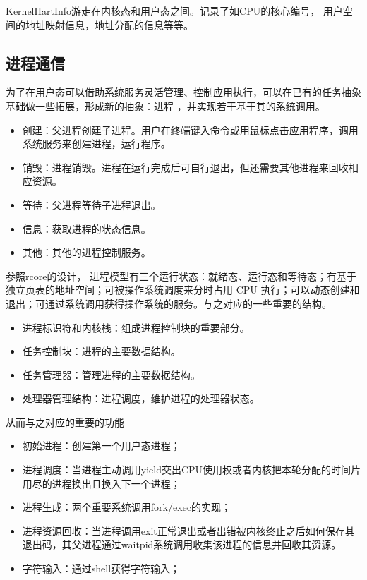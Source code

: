 KernelHartInfo游走在内核态和用户态之间。记录了如CPU的核心编号， 用户空间的地址映射信息，地址分配的信息等等。

\subsection{进程通信}
为了在用户态可以借助系统服务灵活管理、控制应用执行，可以在已有的任务抽象基础做一些拓展，形成新的抽象：进程 ，并实现若干基于其的系统调用。

\begin{itemize}
\item 创建：父进程创建子进程。用户在终端键入命令或用鼠标点击应用程序，调用系统服务来创建进程，运行程序。
\item 销毁：进程销毁。进程在运行完成后可自行退出，但还需要其他进程来回收相应资源。
\item 等待：父进程等待子进程退出。
\item 信息：获取进程的状态信息。
\item 其他：其他的进程控制服务。
\end{itemize}

参照rcore的设计， 进程模型有三个运行状态：就绪态、运行态和等待态；有基于独立页表的地址空间；可被操作系统调度来分时占用 CPU 执行；可以动态创建和退出；可通过系统调用获得操作系统的服务。与之对应的一些重要的结构。

\begin{itemize}
\item 进程标识符和内核栈：组成进程控制块的重要部分。
\item 任务控制块：进程的主要数据结构。
\item 任务管理器：管理进程的主要数据结构。
\item 处理器管理结构：进程调度，维护进程的处理器状态。
\end{itemize}

从而与之对应的重要的功能

\begin{itemize}
\item 初始进程：创建第一个用户态进程；
\item 进程调度：当进程主动调用yield交出CPU使用权或者内核把本轮分配的时间片用尽的进程换出且换入下一个进程；
\item 进程生成：两个重要系统调用fork/exec的实现；
\item 进程资源回收：当进程调用exit正常退出或者出错被内核终止之后如何保存其退出码，其父进程通过waitpid系统调用收集该进程的信息并回收其资源。
\item 字符输入：通过shell获得字符输入；
\end{itemize}

